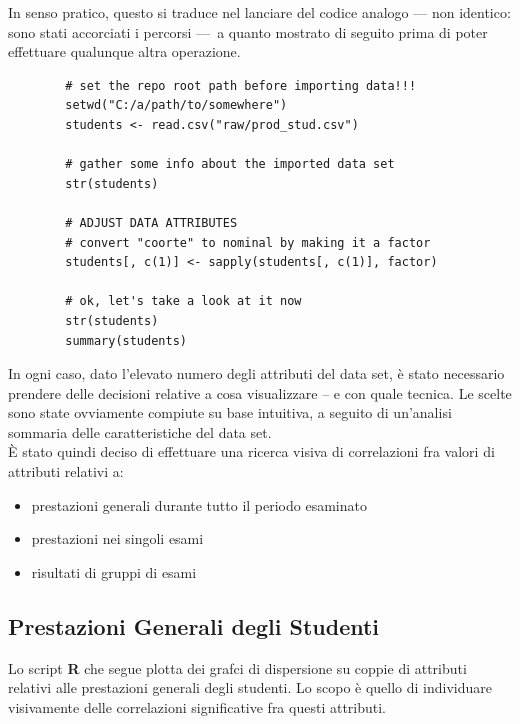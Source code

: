         In senso pratico, questo si traduce nel lanciare del codice analogo \footnotesize{--- non identico: sono stati accorciati i percorsi ---}\normalsize\ a quanto mostrato di seguito prima di poter effettuare qualunque altra operazione.

        \newpage

        \begin{lstlisting}
        # set the repo root path before importing data!!!
        setwd("C:/a/path/to/somewhere")
        students <- read.csv("raw/prod_stud.csv")

        # gather some info about the imported data set
        str(students)

        # ADJUST DATA ATTRIBUTES 
        # convert "coorte" to nominal by making it a factor 
        students[, c(1)] <- sapply(students[, c(1)], factor)

        # ok, let's take a look at it now
        str(students)
        summary(students)
        \end{lstlisting}

        In ogni caso, dato l’elevato numero degli attributi del data set, è stato necessario prendere delle decisioni relative a cosa visualizzare – e con quale tecnica. Le scelte sono state ovviamente compiute su base intuitiva, a seguito di un’analisi sommaria delle caratteristiche del data set. \\

        È stato quindi deciso di effettuare una ricerca visiva di correlazioni fra valori di attributi relativi a:

        \begin{itemize}
            \item prestazioni generali durante tutto il periodo esaminato
            \item prestazioni nei singoli esami
            \item risultati di gruppi di esami
        \end{itemize}

        \subsection{Prestazioni Generali degli Studenti}

            Lo script \textbf{R} che segue plotta dei grafci di dispersione su coppie di attributi relativi alle prestazioni generali degli studenti. Lo scopo è quello di individuare visivamente delle correlazioni significative fra questi attributi.\\

